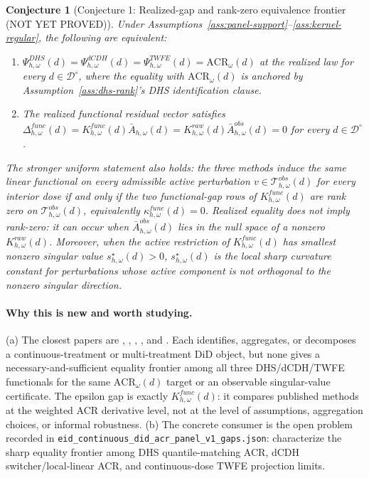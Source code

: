 \documentclass[11pt]{article}
\theoremstyle{definition}
\theoremstyle{plain}
\newtheorem{conjecture}{Conjecture}
\theoremstyle{remark}
\begin{document}
\begin{conjecture}[Conjecture 1: Realized-gap and rank-zero equivalence frontier (NOT YET PROVED)]\label{conj:spectral-frontier}
Under Assumptions~\ref{ass:panel-support}--\ref{ass:kernel-regular}, the following are equivalent:
\begin{enumerate}[label=(\roman*)]
  \item \(\Psi^{DHS}_{h,\omega}(d)=\Psi^{dCDH}_{h,\omega}(d)=\Psi^{TWFE}_{h,\omega}(d)=\mathrm{ACR}_\omega(d)\) at the realized law for every \(d\in\mathcal D^\circ\), where the equality with \(\mathrm{ACR}_\omega(d)\) is anchored by Assumption~\ref{ass:dhs-rank}'s DHS identification clause.
  \item The realized functional residual vector satisfies \(\Delta^{func}_{h,\omega}(d)=K^{func}_{h,\omega}(d)\bar A_{h,\omega}(d)=K^{raw}_{h,\omega}(d)\bar A^{obs}_{h,\omega}(d)=0\) for every \(d\in\mathcal D^\circ\).
\end{enumerate}
The stronger uniform statement also holds: the three methods induce the same linear functional on every admissible active perturbation \(v\in\mathcal T^{obs}_{h,\omega}(d)\) for every interior dose if and only if the two functional-gap rows of \(K^{func}_{h,\omega}(d)\) are rank zero on \(\mathcal T^{obs}_{h,\omega}(d)\), equivalently \(\kappa^{func}_{h,\omega}(d)=0\). Realized equality does not imply rank-zero: it can occur when \(\bar A^{obs}_{h,\omega}(d)\) lies in the null space of a nonzero \(K^{raw}_{h,\omega}(d)\). Moreover, when the active restriction of \(K^{func}_{h,\omega}(d)\) has smallest nonzero singular value \(s_{h,\omega}^\star(d)>0\), \(s_{h,\omega}^\star(d)\) is the local sharp curvature constant for perturbations whose active component is not orthogonal to the nonzero singular direction.
\end{conjecture}
\paragraph{Why this is new and worth studying.}
(a) The closest papers are \citet{DHaultfoeuilleHoderleinSasaki2023}, \citet{deChaisemartinDHaultfoeuillePasquierSowVazquezBare2025}, \citet{CallawayGoodmanBaconSantAnna2024}, \citet{CallawayGoodmanBaconSantAnna2024EventStudies}, and \citet{deChaisemartinDHaultfoeuille2023SeveralTreatments}. Each identifies, aggregates, or decomposes a continuous-treatment or multi-treatment DiD object, but none gives a necessary-and-sufficient equality frontier among all three DHS/dCDH/TWFE functionals for the same \(\mathrm{ACR}_\omega(d)\) target or an observable singular-value certificate. The epsilon gap is exactly \(K^{func}_{h,\omega}(d)\): it compares published methods at the weighted ACR derivative level, not at the level of assumptions, aggregation choices, or informal robustness. (b) The concrete consumer is the open problem recorded in \texttt{eid\_continuous\_did\_acr\_panel\_v1\_gaps.json}: characterize the sharp equality frontier among DHS quantile-matching ACR, dCDH switcher/local-linear ACR, and continuous-dose TWFE projection limits.
\end{document}
